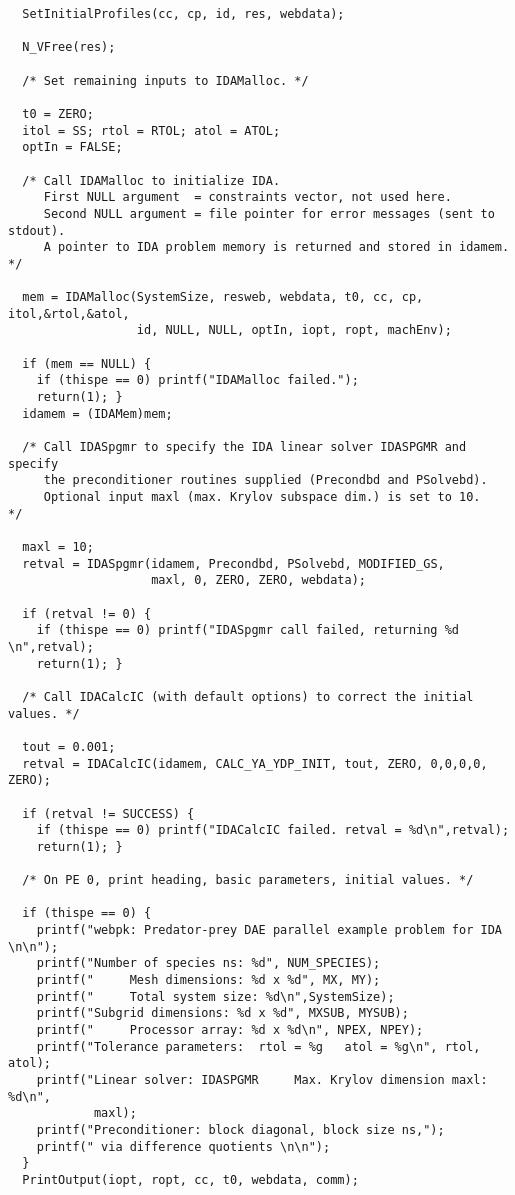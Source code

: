 \begin{verbatim}
  SetInitialProfiles(cc, cp, id, res, webdata);

  N_VFree(res);

  /* Set remaining inputs to IDAMalloc. */

  t0 = ZERO;
  itol = SS; rtol = RTOL; atol = ATOL;
  optIn = FALSE;

  /* Call IDAMalloc to initialize IDA.
     First NULL argument  = constraints vector, not used here.
     Second NULL argument = file pointer for error messages (sent to stdout).
     A pointer to IDA problem memory is returned and stored in idamem.      */

  mem = IDAMalloc(SystemSize, resweb, webdata, t0, cc, cp, itol,&rtol,&atol,
                  id, NULL, NULL, optIn, iopt, ropt, machEnv);

  if (mem == NULL) {
    if (thispe == 0) printf("IDAMalloc failed.");
    return(1); }
  idamem = (IDAMem)mem;

  /* Call IDASpgmr to specify the IDA linear solver IDASPGMR and specify
     the preconditioner routines supplied (Precondbd and PSolvebd).
     Optional input maxl (max. Krylov subspace dim.) is set to 10.   */

  maxl = 10;
  retval = IDASpgmr(idamem, Precondbd, PSolvebd, MODIFIED_GS,
                    maxl, 0, ZERO, ZERO, webdata);

  if (retval != 0) {
    if (thispe == 0) printf("IDASpgmr call failed, returning %d \n",retval);
    return(1); }

  /* Call IDACalcIC (with default options) to correct the initial values. */

  tout = 0.001;
  retval = IDACalcIC(idamem, CALC_YA_YDP_INIT, tout, ZERO, 0,0,0,0, ZERO);

  if (retval != SUCCESS) {
    if (thispe == 0) printf("IDACalcIC failed. retval = %d\n",retval);
    return(1); }

  /* On PE 0, print heading, basic parameters, initial values. */
 
  if (thispe == 0) {
    printf("webpk: Predator-prey DAE parallel example problem for IDA \n\n");
    printf("Number of species ns: %d", NUM_SPECIES);
    printf("     Mesh dimensions: %d x %d", MX, MY);
    printf("     Total system size: %d\n",SystemSize);
    printf("Subgrid dimensions: %d x %d", MXSUB, MYSUB);
    printf("     Processor array: %d x %d\n", NPEX, NPEY);
    printf("Tolerance parameters:  rtol = %g   atol = %g\n", rtol, atol);
    printf("Linear solver: IDASPGMR     Max. Krylov dimension maxl: %d\n",
            maxl);
    printf("Preconditioner: block diagonal, block size ns,"); 
    printf(" via difference quotients \n\n");
  }
  PrintOutput(iopt, ropt, cc, t0, webdata, comm);


\end{verbatim}
